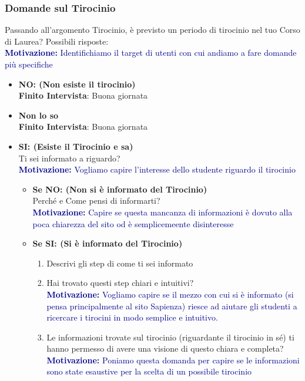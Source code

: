 \subsubsection{Domande sul Tirocinio}
Passando all'argomento Tirocinio, è previsto un periodo di tirocinio nel tuo Corso di Laurea? Possibili risposte:\\
\textcolor{darkblue}{\textbf{Motivazione:} Identifichiamo il target di utenti con cui andiamo a fare domande più specifiche}
\begin{itemize}
    \item \textbf{NO: (Non esiste il tirocinio)}\\
    \textbf{Finito Intervista}: Buona giornata
    \item \textbf{Non lo so}\\
    \textbf{Finito Intervista}: Buona giornata
    \item \textbf{SI: (Esiste il Tirocinio e sa)}\\
    Ti sei informato a riguardo?\\
    \textcolor{darkblue}{\textbf{Motivazione:} Vogliamo capire l'interesse dello studente riguardo il tirocinio}
    \begin{itemize}
        \item \textbf{Se NO: (Non si è informato del Tirocinio)}\\
        Perché e Come pensi di informarti?\\
        \textcolor{darkblue}{\textbf{Motivazione:} Capire se questa mancanza di informazioni è dovuto alla poca chiarezza del sito od è semplicemeente disinteresse}
        \item \textbf{Se SI: (Si è informato del Tirocinio)}
        \begin{enumerate}
            \item Descrivi gli step di come ti sei informato
            \item Hai trovato questi step chiari e intuitivi?\\
            \textcolor{darkblue}{\textbf{Motivazione:} Vogliamo capire se il mezzo con cui si è informato (si pensa principalmente al sito Sapienza) riesce ad aiutare gli studenti a ricercare i tirocini in modo semplice e intuitivo.}
            \item Le informazioni trovate sul tirocinio (riguardante il tirocinio in sé) ti hanno permesso di avere una visione di questo chiara e completa?\\
            \textcolor{darkblue}{\textbf{Motivazione:} Poniamo questa domanda per capire se le informazioni sono state esaustive per la scelta di un possibile tirocinio 
}
\end{enumerate}
\end{itemize}
\end{itemize}
